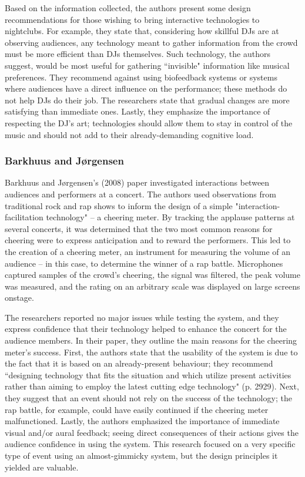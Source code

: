 Based on the information collected, the authors present some design recommendations for those wishing to bring interactive technologies to nightclubs. For example, they state that, considering how skillful DJs are at observing audiences, any technology meant to gather information from the crowd must be more efficient than DJs themselves. Such technology, the authors suggest, would be most useful for gathering ``invisible" information like musical preferences. They recommend against using biofeedback systems or systems where audiences have a direct influence on the performance; these methods do not help DJs do their job. The researchers state that gradual changes are more satisfying than immediate ones. Lastly, they emphasize the importance of respecting the DJ's art; technologies should allow them to stay in control of the music and should not add to their already-demanding cognitive load.

\subsubsection{Barkhuus and J{\o}rgensen}

Barkhuus and J{\o}rgensen's (2008) paper investigated interactions between audiences and performers at a concert. The authors used observations from traditional rock and rap shows to inform the design of a simple "interaction-facilitation technology" -- a cheering meter. By tracking the applause patterns at several concerts, it was determined that the two most common reasons for cheering were to express anticipation and to reward the performers. This led to the creation of a cheering meter, an instrument for measuring the volume of an audience -- in this case, to determine the winner of a rap battle. Microphones captured samples of the crowd's cheering, the signal was filtered, the peak volume was measured, and the rating on an arbitrary scale was displayed on large screens onstage.

The researchers reported no major issues while testing the system, and they express confidence that their technology helped to enhance the concert for the audience members. In their paper, they outline the main reasons for the cheering meter's success. First, the authors state that the usability of the system is due to the fact that it is based on an already-present behaviour; they recommend ``designing technology that fits the situation and which utilize present activities rather than aiming to employ the latest cutting edge technology" (p. 2929). Next, they suggest that an event should not rely on the success of the technology; the rap battle, for example, could have easily continued if the cheering meter malfunctioned. Lastly, the authors emphasized the importance of immediate visual and/or aural feedback; seeing direct consequences of their actions gives the audience confidence in using the system. This research focused on a very specific type of event using an almost-gimmicky system, but the design principles it yielded are valuable.

